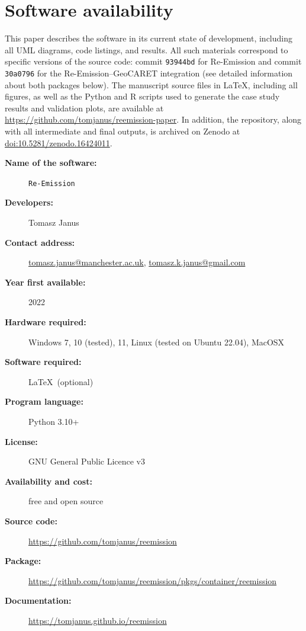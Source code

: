 \documentclass[final,1p,times]{elsarticle}
\begin{document}
\section{Software availability}
\label{sec:software_availability}
This paper describes the software in its current state of development, including all UML diagrams, code listings, and results. All such materials correspond to specific versions of the source code: commit \texttt{93944bd} for Re-Emission and commit \texttt{30a0796} for the Re-Emission–GeoCARET integration (see detailed information about both packages below).
The manuscript source files in \LaTeX, including all figures, as well as the Python and R scripts used to generate the case study results and validation plots, are available at \href{https://github.com/tomjanus/reemission-paper}{https://github.com/tomjanus/reemission-paper}.
In addition, the repository, along with all intermediate and final outputs, is archived on Zenodo at \href{https://doi.org/10.5281/zenodo.16424011}{doi:10.5281/zenodo.16424011}.

\begin{description}
  \item[\textbf{Name of the software:}] \texttt{Re-Emission}
  \item[\textbf{Developers:}] Tomasz Janus
  \item[\textbf{Contact address:}] \href{mailto:tomasz.janus@manchester.ac.uk}{tomasz.janus@manchester.ac.uk}, \href{mailto:tomasz.k.janus@gmail.com}{tomasz.k.janus@gmail.com}
  \item[\textbf{Year first available:}] 2022
  \item[\textbf{Hardware required:}] Windows 7, 10 (tested), 11, Linux (tested on Ubuntu 22.04), MacOSX
  \item[\textbf{Software required:}] \LaTeX \, (optional)
  \item[\textbf{Program language:}] Python 3.10+
  \item[\textbf{License:}] GNU General Public Licence v3
  \item[\textbf{Availability and cost:}] free and open source
  \item[\textbf{Source code:}] \href{https://github.com/tomjanus/reemission}{https://github.com/tomjanus/reemission} %
  \item[\textbf{Package:}] \href{https://github.com/tomjanus/reemission/pkgs/container/reemission}{https://github.com/tomjanus/reemission/pkgs/container/reemission}
  \item[\textbf{Documentation:}] \href{https://tomjanus.github.io/reemission}{https://tomjanus.github.io/reemission}
\end{description}
\end{document}
